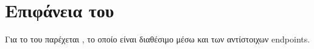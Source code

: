 \section{ Επιφάνεια του }
\label{sec:appendix_engine_openapi}

Για το  του \texttt{} παρέχεται ,
το οποίο είναι διαθέσιμο μέσω  και των αντίστοιχων  endpoints.
